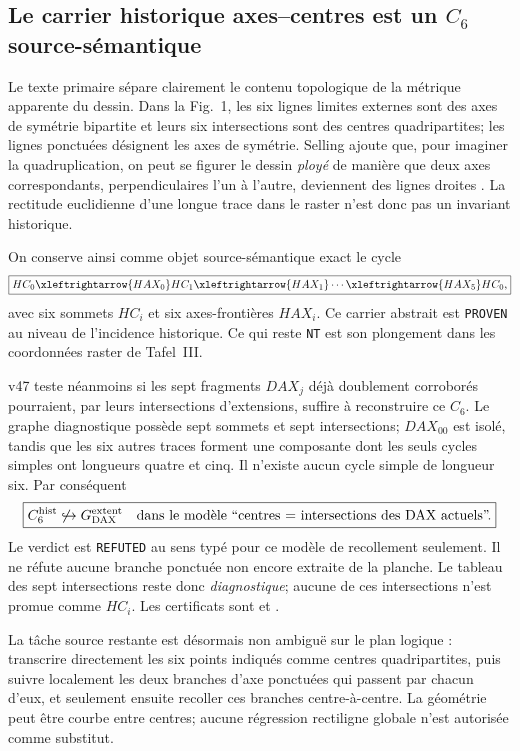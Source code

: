 \documentclass[11pt,a4paper]{article}
\newcommand{\certProven}{\texttt{PROVEN}}
\newcommand{\certRefuted}{\texttt{REFUTED}}
\newcommand{\certNT}{\texttt{NT}}
\begin{document}
\subsection{Le carrier historique axes--centres est un $C_6$ source-sémantique}

Le texte primaire sépare clairement le contenu topologique de la métrique apparente du dessin. Dans la Fig.~1, les six lignes limites externes sont des axes de symétrie bipartite et leurs six intersections sont des centres quadripartites; les lignes ponctuées désignent les axes de symétrie. Selling ajoute que, pour imaginer la quadruplication, on peut se figurer le dessin \emph{ployé} de manière que deux axes correspondants, perpendiculaires l'un à l'autre, deviennent des lignes droites \cite{Selling1877}. La rectitude euclidienne d'une longue trace dans le raster n'est donc pas un invariant historique.

On conserve ainsi comme objet source-sémantique exact le cycle
\[
  \boxed{
  HC_0\xleftrightarrow{HAX_0}HC_1
  \xleftrightarrow{HAX_1}\cdots
  \xleftrightarrow{HAX_5}HC_0,}
\]
avec six sommets $HC_i$ et six axes-frontières $HAX_i$. Ce carrier abstrait est \certProven{} au niveau de l'incidence historique. Ce qui reste \certNT{} est son plongement dans les coordonnées raster de Tafel~III.

v47 teste néanmoins si les sept fragments $DAX_j$ déjà doublement corroborés pourraient, par leurs intersections d'extensions, suffire à reconstruire ce $C_6$. Le graphe diagnostique possède sept sommets et sept intersections; $DAX_{00}$ est isolé, tandis que les six autres traces forment une composante dont les seuls cycles simples ont longueurs quatre et cinq. Il n'existe aucun cycle simple de longueur six. Par conséquent
\[
 \boxed{
  C_6^{\rm hist}\not\hookrightarrow
  G_{\rm DAX}^{\rm extent}
  \quad\text{dans le modèle ``centres = intersections des DAX actuels''.}}
\]
Le verdict est \certRefuted{} au sens typé pour ce modèle de recollement seulement. Il ne réfute aucune branche ponctuée non encore extraite de la planche. Le tableau des sept intersections reste donc \emph{diagnostique}; aucune de ces intersections n'est promue comme $HC_i$. Les certificats sont  et .

La tâche source restante est désormais non ambiguë sur le plan logique : transcrire directement les six points indiqués comme centres quadripartites, puis suivre localement les deux branches d'axe ponctuées qui passent par chacun d'eux, et seulement ensuite recoller ces branches centre-à-centre. La géométrie peut être courbe entre centres; aucune régression rectiligne globale n'est autorisée comme substitut.
\end{document}
